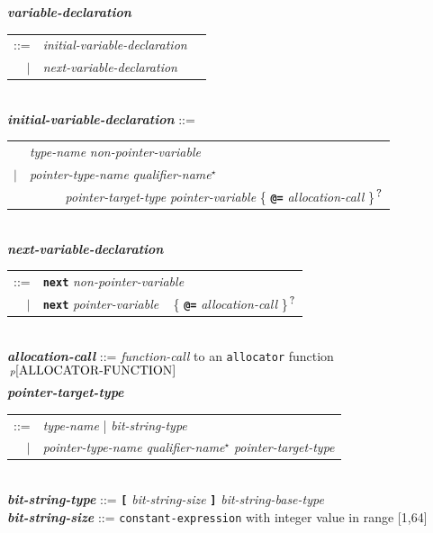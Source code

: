 \documentclass[12pt]{article}
\newcommand{\TT}[1]{{\tt \bfseries #1}}
\newcommand{\STAR}{{\Large $^\star$}}
\newcommand{\QMARK}{{$^{\,\mbox{\footnotesize ?}}$}}
\newcommand{\ttkey}[1]{{\tt \bfseries #1}}
\newcommand{\emkey}[1]{{\em \bfseries #1}}
\newcommand{\pagnote}[1]{$\,^{p\pageref{#1}}$}
\newenvironment{indpar}[1][0.3in]%
	{\begin{list}{}%
		     {\setlength{\itemsep}{0in}%
		      \setlength{\topsep}{0in}%
		      \setlength{\parsep}{1ex}%
		      \setlength{\labelwidth}{#1}%
		      \setlength{\leftmargin}{#1}%
		      \addtolength{\leftmargin}{\labelsep}}%
	 \item}%
	{\end{list}}
\begin{document}
\begin{indpar}
\emkey{variable-declaration}\label{VARIABLE-DECLARATION}
    \begin{tabular}[t]{@{}rll}
    ::= & {\em initial-variable-declaration} \\
    $|$ & {\em next-variable-declaration} \\
    \end{tabular}
\\[0.5ex]
\emkey{initial-variable-declaration}\label{INITIAL-VARIABLE-DECLARATION} ::= \\
\hspace*{0.5in}\begin{tabular}{rl}
	    & {\em type-name} {\em non-pointer-variable} \\
	$|$ & {\em pointer-type-name} {\em qualifier-name}\STAR{} \\
	    & ~~~~~ {\em pointer-target-type} {\em pointer-variable}
	               \{ \TT{@=} {\em allocation-call} \}\QMARK{} \\
	\end{tabular}
\\[0.5ex]
\emkey{next-variable-declaration}\label{NEXT-VARIABLE-DECLARATION} \\
\hspace*{0.5in}\begin{tabular}{rl}
      ::= & \ttkey{next} {\em non-pointer-variable} \\
      $|$ & \ttkey{next} {\em pointer-variable}
	      ~ \{ \TT{@=} {\em allocation-call} \}\QMARK{} \\
      \end{tabular}
\\[0.5ex]
\emkey{allocation-call}\label{ALLOCATION-CALL} ::=
    {\em function-call} to
    an {\tt allocator} function\pagnote{ALLOCATOR-FUNCTION}
\\[0.5ex]
\emkey{pointer-target-type}\label{TARGET-TYPE}
	\begin{tabular}[t]{rl}
	::= & {\em type-name} | {\em bit-string-type} \\
	$|$ & {\em pointer-type-name} {\em qualifier-name}\STAR{}
	      {\em pointer-target-type}
	\end{tabular}
\\[0.5ex]
\emkey{bit-string-type}\label{BIT-STRING-TYPE}
    ::= \TT{[} {\em bit-string-size} \TT{]} {\em bit-string-base-type}
\\[0.5ex]
\emkey{bit-string-size} ::= {\tt constant-expression}
		    with integer value in range [1,64]
\\[0.5ex]

\end{indpar}
\end{document}
